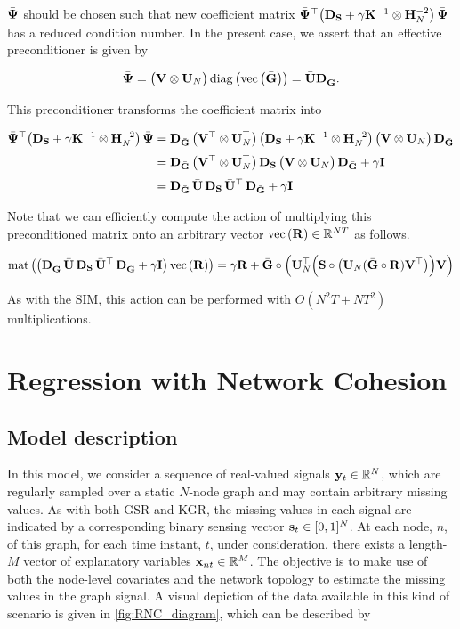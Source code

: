 $\bar{\mathbf{\Psi}} $ should be chosen such that new coefficient matrix $\bar{\mathbf{\Psi}} ^\top \big(\mathbf{D}_{\mathbf{S}} + \gamma \mathbf{K}^{-1} \otimes \mathbf{H}_N^{-2} \big) \, \bar{\mathbf{\Psi}} $ has a reduced condition number. In the present case, we assert that an effective preconditioner is given by 

\begin{equation}
    \bar{\mathbf{\Psi}} = \big(\mathbf{V} \otimes \mathbf{U}_N \big) \, \text{\textup{diag}}\left(\text{\textup{vec}}\left(\bar{\mathbf{G}}\right)\right) = \bar{\mathbf{U}} \mathbf{D}_{\bar{\mathbf{G}}}.
\end{equation}

This preconditioner transforms the coefficient matrix into 

\begin{align*}
    \bar{\mathbf{\Psi}} ^\top \big(\mathbf{D}_{\mathbf{S}} + \gamma \mathbf{K}^{-1} \otimes \mathbf{H}_N^{-2} \big) \, \bar{\mathbf{\Psi}}   &= \mathbf{D}_{\bar{\mathbf{G}}} \, \big(\mathbf{V}^\top \otimes \mathbf{U}_N^\top \big) \, \big(\mathbf{D}_{\mathbf{S}} + \gamma \mathbf{K}^{-1} \otimes \mathbf{H}_N^{-2} \big) \,  \big(\mathbf{V} \otimes \mathbf{U}_N \big) \, \mathbf{D}_{\bar{\mathbf{G}}}   \\[0.1cm]
    &= \mathbf{D}_{\bar{\mathbf{G}}} \, \big(\mathbf{V}^\top \otimes \mathbf{U}_N^\top \big) \, \mathbf{D}_{\mathbf{S}} \, \big(\mathbf{V} \otimes \mathbf{U}_N \big) \, \mathbf{D}_{\bar{\mathbf{G}}} + \gamma \mathbf{I} \\[0.1cm]
    &= \mathbf{D}_{\bar{\mathbf{G}}} \, \bar{\mathbf{U}} \, \mathbf{D}_{\mathbf{S}} \, \bar{\mathbf{U}}^\top \, \mathbf{D}_{\bar{\mathbf{G}}} + \gamma \mathbf{I} 
\end{align*}

Note that we can efficiently compute the action of multiplying this preconditioned matrix onto an arbitrary vector $\text{\textup{vec}}\left(\mathbf{R}\right) \in \mathbb{R}^{NT}$ as follows. 

$$
\text{\textup{mat}}\left(\big(\mathbf{D}_{\bar{\mathbf{G}}} \, \bar{\mathbf{U}} \, \mathbf{D}_{\mathbf{S}} \, \bar{\mathbf{U}}^\top \, \mathbf{D}_{\bar{\mathbf{G}}} + \gamma \mathbf{I}  \big)\, \text{\textup{vec}}\left(\mathbf{R}\right)\right) = \gamma \mathbf{R} + \bar{\mathbf{G}} \circ \left(\mathbf{U}_N^\top \Big( \mathbf{S} \circ \big(\mathbf{U}_N (\bar{\mathbf{G}} \circ \mathbf{R}) \mathbf{V}^\top \big) \Big) \mathbf{V}\right) 
$$

As with the SIM, this action can be performed with $O(N^2T + NT^2)$ multiplications. 



\section{Regression with Network Cohesion}

\label{sec:rnc_mdp}

\subsection{Model description}

In this model, we consider a sequence of real-valued signals $\mathbf{y}_t \in \mathbb{R}^{N}$, which are regularly sampled over a static $N$-node graph and may contain arbitrary missing values. As with both GSR and KGR, the missing values in each signal are indicated by a corresponding binary sensing vector $\mathbf{s}_t \in [0, 1]^{N}$. At each node, $n$, of this graph, for each time instant, $t$, under consideration, there exists a length-$M$ vector of explanatory variables $\mathbf{x}_{nt} \in \mathbb{R}^{M}$. The objective is to make use of both the node-level covariates and the network topology to estimate the missing values in the graph signal. A visual depiction of the data available in this kind of scenario is given in \cref{fig:RNC_diagram}, which can be described by 

